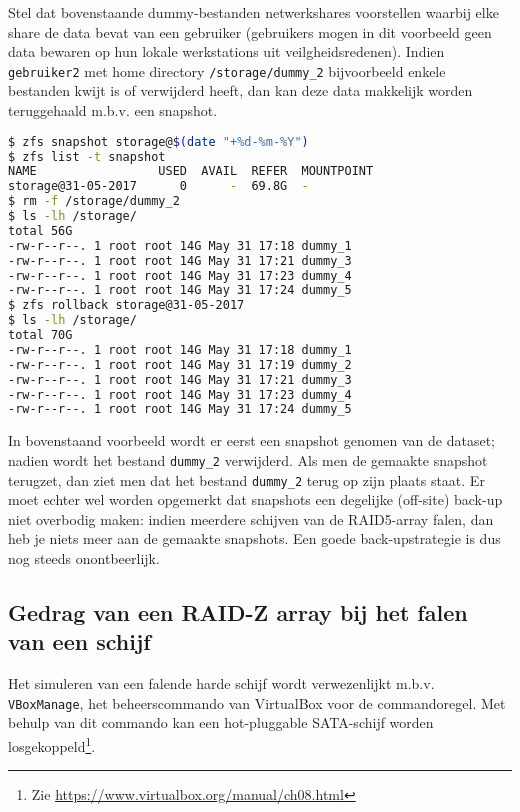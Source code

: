 Stel dat bovenstaande dummy-bestanden netwerkshares voorstellen waarbij elke share de data bevat van een gebruiker (gebruikers mogen in dit voorbeeld geen data bewaren op hun lokale werkstations uit veilgheidsredenen). Indien \texttt{gebruiker2} met home directory \texttt{/storage/dummy\_2} bijvoorbeeld enkele bestanden kwijt is of verwijderd heeft, dan kan deze data makkelijk worden teruggehaald m.b.v. een snapshot.

\begin{lstlisting}[language=bash,style=command_style]
$ zfs snapshot storage@$(date "+%d-%m-%Y")
$ zfs list -t snapshot
NAME                 USED  AVAIL  REFER  MOUNTPOINT
storage@31-05-2017      0      -  69.8G  -
$ rm -f /storage/dummy_2
$ ls -lh /storage/
total 56G
-rw-r--r--. 1 root root 14G May 31 17:18 dummy_1
-rw-r--r--. 1 root root 14G May 31 17:21 dummy_3
-rw-r--r--. 1 root root 14G May 31 17:23 dummy_4
-rw-r--r--. 1 root root 14G May 31 17:24 dummy_5
$ zfs rollback storage@31-05-2017
$ ls -lh /storage/
total 70G
-rw-r--r--. 1 root root 14G May 31 17:18 dummy_1
-rw-r--r--. 1 root root 14G May 31 17:19 dummy_2
-rw-r--r--. 1 root root 14G May 31 17:21 dummy_3
-rw-r--r--. 1 root root 14G May 31 17:23 dummy_4
-rw-r--r--. 1 root root 14G May 31 17:24 dummy_5
\end{lstlisting}

In bovenstaand voorbeeld wordt er eerst een snapshot genomen van de dataset; nadien wordt het bestand \texttt{dummy\_2} verwijderd. Als men de gemaakte snapshot terugzet, dan ziet men dat het bestand \texttt{dummy\_2} terug op zijn plaats staat. Er moet echter wel worden opgemerkt dat snapshots een degelijke (off-site) back-up niet overbodig maken: indien meerdere schijven van de RAID5-array falen, dan heb je niets meer aan de gemaakte snapshots. Een goede back-upstrategie is dus nog steeds onontbeerlijk.

\subsection{Gedrag van een RAID-Z array bij het falen van een schijf}

Het simuleren van een falende harde schijf wordt verwezenlijkt m.b.v. \texttt{VBoxManage}, het beheerscommando van VirtualBox voor de commandoregel. Met behulp van dit commando kan een hot-pluggable SATA-schijf worden losgekoppeld\footnote{Zie \url{https://www.virtualbox.org/manual/ch08.html}}. 

